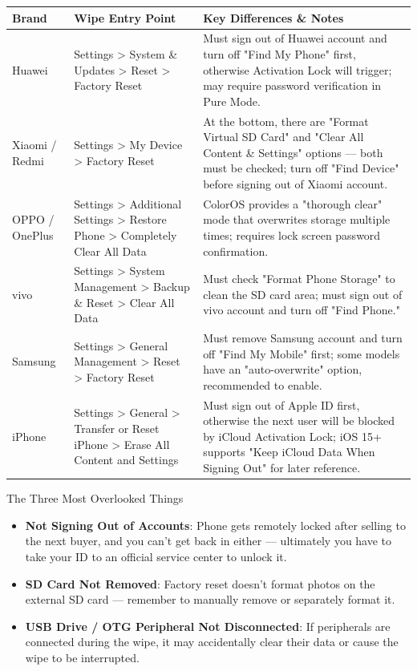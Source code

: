 \begin{center}
\begin{tabularx}{\linewidth}{|X|X|X|}
\hline
\textbf{Brand} & \textbf{Wipe Entry Point} & \textbf{Key Differences \& Notes} \tabularnewline
\hline
Huawei & Settings > System \& Updates > Reset > Factory Reset & Must sign out of Huawei account and turn off "Find My Phone" first, otherwise Activation Lock will trigger; may require password verification in Pure Mode. \tabularnewline
Xiaomi / Redmi & Settings > My Device > Factory Reset & At the bottom, there are "Format Virtual SD Card" and "Clear All Content \& Settings" options — both must be checked; turn off "Find Device" before signing out of Xiaomi account. \tabularnewline
OPPO / OnePlus & Settings > Additional Settings > Restore Phone > Completely Clear All Data & ColorOS provides a "thorough clear" mode that overwrites storage multiple times; requires lock screen password confirmation. \tabularnewline
vivo & Settings > System Management > Backup \& Reset > Clear All Data & Must check "Format Phone Storage" to clean the SD card area; must sign out of vivo account and turn off "Find Phone." \tabularnewline
Samsung & Settings > General Management > Reset > Factory Reset & Must remove Samsung account and turn off "Find My Mobile" first; some models have an "auto-overwrite" option, recommended to enable. \tabularnewline
iPhone & Settings > General > Transfer or Reset iPhone > Erase All Content and Settings & Must sign out of Apple ID first, otherwise the next user will be blocked by iCloud Activation Lock; iOS 15+ supports "Keep iCloud Data When Signing Out" for later reference. \tabularnewline
\hline
\end{tabularx}
\end{center}

\begin{tcbwarn}{The Three Most Overlooked Things}
\begin{itemize}
  \item \textbf{Not Signing Out of Accounts}: Phone gets remotely locked after selling to the next buyer, and you can't get back in either — ultimately you have to take your ID to an official service center to unlock it.
  \item \textbf{SD Card Not Removed}: Factory reset doesn't format photos on the external SD card — remember to manually remove or separately format it.
  \item \textbf{USB Drive / OTG Peripheral Not Disconnected}: If peripherals are connected during the wipe, it may accidentally clear their data or cause the wipe to be interrupted.
\end{itemize}

\end{tcbwarn}

